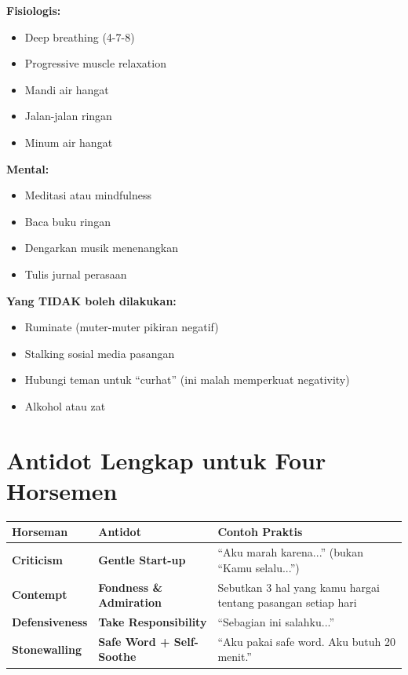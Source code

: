 \begin{praktikbox}
\textbf{Fisiologis:}
\begin{itemize}
    \item Deep breathing (4-7-8)
    \item Progressive muscle relaxation
    \item Mandi air hangat
    \item Jalan-jalan ringan
    \item Minum air hangat
\end{itemize}

\textbf{Mental:}
\begin{itemize}
    \item Meditasi atau mindfulness
    \item Baca buku ringan
    \item Dengarkan musik menenangkan
    \item Tulis jurnal perasaan
\end{itemize}

\textbf{Yang TIDAK boleh dilakukan:}
\begin{itemize}
    \item Ruminate (muter-muter pikiran negatif)
    \item Stalking sosial media pasangan
    \item Hubungi teman untuk ``curhat'' (ini malah memperkuat negativity)
    \item Alkohol atau zat
\end{itemize}
\end{praktikbox}

\section{Antidot Lengkap untuk Four Horsemen}

\begin{center}
\renewcommand{\arraystretch}{1.5}
\begin{tabular}{|>{\raggedright}p{3cm}|>{\raggedright}p{4.5cm}|>{\raggedright\arraybackslash}p{7.5cm}|}
\hline
\rowcolor{primary!20}
\textbf{Horseman} & \textbf{Antidot} & \textbf{Contoh Praktis} \\
\hline
\textbf{Criticism} & \textbf{Gentle Start-up} & ``Aku marah karena...'' (bukan ``Kamu selalu...'') \\
\hline
\textbf{Contempt} & \textbf{Fondness \& Admiration} & Sebutkan 3 hal yang kamu hargai tentang pasangan setiap hari \\
\hline
\textbf{Defensiveness} & \textbf{Take Responsibility} & ``Sebagian ini salahku...'' \\
\hline
\textbf{Stonewalling} & \textbf{Safe Word + Self-Soothe} & ``Aku pakai safe word. Aku butuh 20 menit.'' \\
\hline
\end{tabular}
\end{center}

